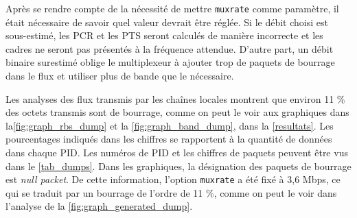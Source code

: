 \documentclass[12pt,a4paper]{article}
\begin{document}
Après se rendre compte de la nécessité de mettre \texttt{muxrate} comme paramètre, il était nécessaire de savoir quel valeur devrait être réglée. Si le débit choisi est sous-estimé, les PCR et les PTS seront calculés de manière incorrecte et les cadres ne seront pas présentés à la fréquence attendue. D'autre part, un débit binaire surestimé oblige le multiplexeur à ajouter trop de paquets de bourrage dans le flux et utiliser plus de bande que le nécessaire.


Les analyses des flux transmis par les chaînes locales montrent que environ 11 \% des octets transmis sont de bourrage, comme on peut le voir aux graphiques dans la\autoref{fig:graph_rbs_dump} et la \autoref{fig:graph_band_dump}, dans la \autoref{resultats}. Les pourcentages indiqués dans les chiffres se rapportent à la quantité de données dans chaque PID. Les numéros de PID et les chiffres de paquets peuvent être vus dans le \autoref{tab_dumps}. Dans les graphiques, la désignation des paquets de bourrage est \textit{null packet}. De cette information, l'option \texttt{muxrate} a été fixé à 3,6 Mbps, ce qui se traduit par un bourrage de l'ordre de 11 \%, comme on peut le voir dans l'analyse de la \autoref{fig:graph_generated_dump}.

\end{document}
